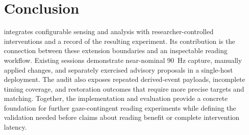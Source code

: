 \section{Conclusion}

\rtr{} integrates configurable sensing and analysis with researcher-controlled interventions and a record of the resulting experiment. Its contribution is the connection between these extension boundaries and an inspectable reading workflow. Existing sessions demonstrate near-nominal 90~Hz capture, manually applied changes, and separately exercised advisory proposals in a single-host deployment. The audit also exposes repeated derived-event payloads, incomplete timing coverage, and restoration outcomes that require more precise targets and matching. Together, the implementation and evaluation provide a concrete foundation for further gaze-contingent reading experiments while defining the validation needed before claims about reading benefit or complete intervention latency.
